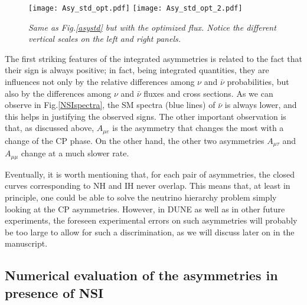 \documentclass[12pt]{article}
\begin{document}
\begin{figure}
    \centering
    \texttt{[image: Asy\_std\_opt.pdf]}
    \texttt{[image: Asy\_std\_opt\_2.pdf]}
    \caption{\it Same as Fig.\ref{asystd} but with the optimized flux. Notice the different vertical scales on the left and right panels. }
    \label{asystd_opt}
\end{figure}

The first striking features of the integrated asymmetries is related to the fact that their sign is always positive; in fact, being integrated quantities, they are influences  not only by the relative differences among $\nu$ and $\bar \nu$ probabilities, but also by the  differences among $\nu$ and $\bar \nu$ fluxes and cross sections. As we can observe in Fig.\ref{NSIspectra}, the SM spectra (blue lines) of $\bar\nu$  is always lower, and this helps in justifying the observed signs. 
The other important observation is that, as discussed above, $A_{\mu e}$ is the asymmetry that changes the most with a change of the CP phase. On the other hand, the other two asymmetries $A_{\mu \tau}$ and  $A_{\mu \mu}$ change at a much slower rate. 

Eventually, it is worth mentioning that, for each pair of asymmetries, the closed curves corresponding to NH and IH never overlap. This means that, at least in principle, one could be able to solve the neutrino hierarchy problem simply looking at the CP asymmetries. However, in DUNE as well as in other future experiments, the foreseen experimental errors on such asymmetries will probably be too large to allow for such a discrimination, as we will discuss later on in the manuscript.

\subsection{Numerical evaluation of the asymmetries in presence of NSI}
\end{document}
